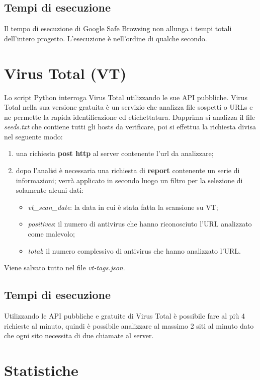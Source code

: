 \documentclass[a4paper, 11pt, oneside]{report}
\begin{document}
\subsection{Tempi di esecuzione}
Il tempo di esecuzione di Google Safe Browsing non allunga i tempi totali dell'intero progetto. L'esecuzione è nell'ordine di qualche secondo.

\section{Virus Total (VT)}
Lo script Python interroga Virus Total \cite{vt} utilizzando le sue API pubbliche. Virus Total nella sua versione gratuita è un servizio che analizza file sospetti o URLs e ne permette la rapida identificazione ed etichettatura. Dapprima si analizza il file \textit{seeds.txt} che contiene tutti gli hosts da verificare, poi si effettua la richiesta divisa nel seguente modo:
\begin{enumerate}
	\item una richiesta \textbf{post http} al server contenente l'url da analizzare;
	\item dopo l'analisi è necessaria una richiesta di \textbf{report} contenente un serie di informazioni; verrà applicato in secondo luogo un filtro per la selezione di solamente alcuni dati:
	\begin{itemize}
		\item \textit{vt\_scan\_date}: la data in cui è stata fatta la scansione su VT;
		\item \textit{positives}: il numero di antivirus che hanno riconosciuto l'URL analizzato come malevolo;
		\item \textit{total}: il numero complessivo di antivirus che hanno analizzato l'URL.
	\end{itemize}	 
\end{enumerate} 
Viene salvato tutto nel file \textit{vt-tags.json}. 

\subsection{Tempi di esecuzione}
Utilizzando le API pubbliche e gratuite di Virus Total è possibile fare al più 4 richieste al minuto, quindi è possibile analizzare al massimo 2 siti al minuto dato che ogni sito necessita di due chiamate al server.

\section{Statistiche}
\end{document}
